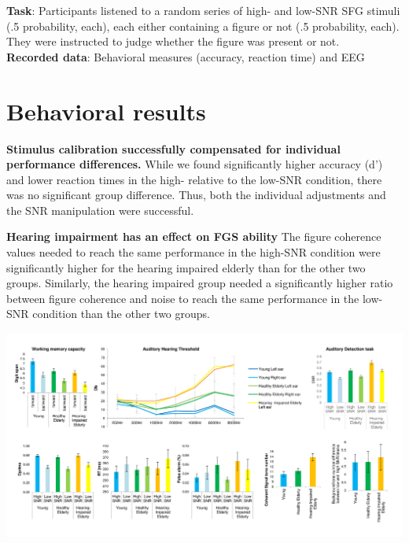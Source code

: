 \documentclass[a0,landscape]{a0poster}
\begin{document}
\begin{multicols}{3}
\textbf{Task}: Participants listened to a random series of high- and low-SNR SFG stimuli (.5 probability, each), each either containing a figure or not (.5 probability, each). They were instructed to judge whether the figure was present or not. \\
\textbf{Recorded data}: Behavioral measures (accuracy, reaction time) and EEG

\columnbreak

\section*{Behavioral results}

	 \textbf{Stimulus calibration successfully compensated for individual performance differences.} While we found significantly higher accuracy (d') and lower reaction times in the high- relative to the low-SNR condition, there was no significant group difference. Thus, both the individual adjustments and the SNR manipulation were successful.
	
	 \textbf{Hearing impairment has an effect on FGS ability} The figure coherence
	 values needed to reach the same performance in the high-SNR condition
	 were significantly higher for the hearing impaired elderly than for the
	 other two groups. Similarly, the hearing impaired group needed a 
	 significantly higher ratio between figure coherence and noise to reach
	 the same performance in the low-SNR condition than the other two groups.
	 
	 \begin{center}\vspace{0cm}
	 	\includegraphics[width=0.95\linewidth]{Fig_behav.png}
	 \end{center}\vspace{0cm}
 
 

\end{multicols}
\end{document}

